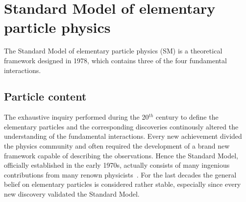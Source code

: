 \section{Standard Model of elementary particle physics} \label{sec::SM}
The Standard Model of elementary particle physics (SM) is a theoretical framework designed in 1978, which contains three of the four fundamental interactions.

\subsection{Particle content}

The exhaustive inquiry performed during the 20$^{th}$ century to define the elementary particles and the corresponding discoveries continously altered the understanding of the fundamental interactions.
Every new achievement divided the physics community and often required the development of a brand new framework capable of describing the observations.
Hence the Standard Model, officially established in the early 1970s, actually consists of many ingenious contributions from many renown physicists~\cite{MandlAndShaw, PeskinAndSchroeder, Paschos:2007pi}. 
For the last decades the general belief on elementary particles is considered rather stable, especially since every new discovery validated the Standard Model. %
\\

